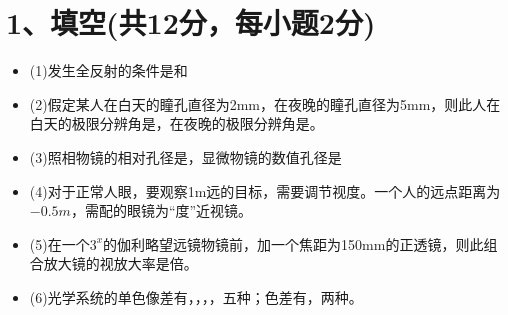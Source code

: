 \documentclass[11pt,a4paper]{article}
\begin{document}
    \section*{1、填空(共12分，每小题2分)}
    \begin{itemize}
        \vspace{0mm}
        \item (1)发生全反射的条件是\underline{\makebox[2cm]{}}和\underline{\makebox[2cm]{}}
        \vspace{0mm}
        \item (2)假定某人在白天的瞳孔直径为2mm，在夜晚的瞳孔直径为5mm，则此人在白天的极限分辨角是\underline{\makebox[2cm]{}}，在夜晚的极限分辨角是\underline{\makebox[2cm]{}}。
        \vspace{0mm}
        \item (3)照相物镜的相对孔径是\underline{\makebox[2cm]{}}，显微物镜的数值孔径是\underline{\makebox[2cm]{}}
        \vspace{0mm}
        \item (4)对于正常人眼，要观察1m远的目标，需要调节\underline{\makebox[2cm]{}}视度。一个人的远点距离为$-0.5m$，需配的眼镜为\underline{\makebox[2cm]{}}“度”近视镜。
        \vspace{0mm}
        \item (5)在一个$3^{x}$的伽利略望远镜物镜前，加一个焦距为150mm的正透镜，则此组合放大镜的视放大率是\underline{\makebox[2cm]{}}倍。
        \vspace{0mm}
        \item (6)光学系统的单色像差有\underline{\makebox[2cm]{}}，\underline{\makebox[2cm]{}}，\underline{\makebox[2cm]{}}，\underline{\makebox[2cm]{}}，\underline{\makebox[2cm]{}}五种；色差有\underline{\makebox[2cm]{}}，\underline{\makebox[2cm]{}}两种。
        \vspace{0mm}
    \end{itemize}
\end{document}
